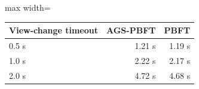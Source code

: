 \begin{adjustbox}{max width=\linewidth}
\begin{tabular}{lrr}
\toprule
View-change timeout & AGS-PBFT & PBFT \\
\midrule
0.5 s & 1.21 s & 1.19 s \\
1.0 s & 2.22 s & 2.17 s \\
2.0 s & 4.72 s & 4.68 s \\
\bottomrule
\end{tabular}
\end{adjustbox}
\par{}
